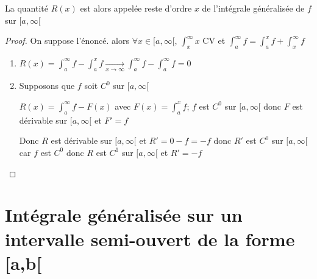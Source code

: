 \documentclass[11pt,hidelinks]{book}
\theoremstyle{mytheoremstyle}
\theoremstyle{mytheoremstyle}
\theoremstyle{mytheoremstyle}
\theoremstyle{mytheoremstyle}
\theoremstyle{mytheoremstyle}
\theoremstyle{mytheoremstyle}
\theoremstyle{mytheoremstyle}
\theoremstyle{mytheoremstyle}
\theoremstyle{myproblemstyle}
\def\ig#1{\int_{a}^{\infty} #1}
\def\af{[a,\infty[}
\begin{document}
\begin{adjustwidth}{-2em}{-1em}
\begin{theorem}
\begin{enumerate}
        \begin{rmq}
            La quantité $R(x)$ est alors appelée reste d'ordre $x$ de l'intégrale généralisée de $f$ sur $\af$
        \end{rmq}
        \end{enumerate}

        
        \begin{proof}
            On suppose l'énoncé. 
            alors $\forall x \in \af$, $\int_{x}^{\infty} x$ CV et $\ig{f} = \int_{a}^{x} f + \int_{x}^{\infty} f$
            \begin{enumerate} 
            \item $R(x) = \ig{f} - \int_{a}^{x} f \xrightarrow[x \to \infty]{} \ig{f} - \ig{f} = 0$
             
            \item Supposons que $f$ soit $C^0$ sur $\af$ 
             
            $R(x) = \ig{f} - F(x)$ avec $F(x) = \int_{a}^{x} f$; $f$ est $C^0$ sur $\af$ donc $F$ est dérivable 
            sur $\af$ et $F' = f$ 
             
            Donc $R$ est dérivable sur $\af$ et $R' = 0 - f = -f$ 
            donc $R'$ est $C^0$ sur $\af$ car $f$ est $C^0$ donc $R$ est $C^1$ sur $\af$ et $R' = -f$
            \end{enumerate}
        \end{proof}
    \end{theorem}
\end{adjustwidth}

    \section{Intégrale généralisée sur un intervalle semi-ouvert de la forme [a,b[}
\end{document}
